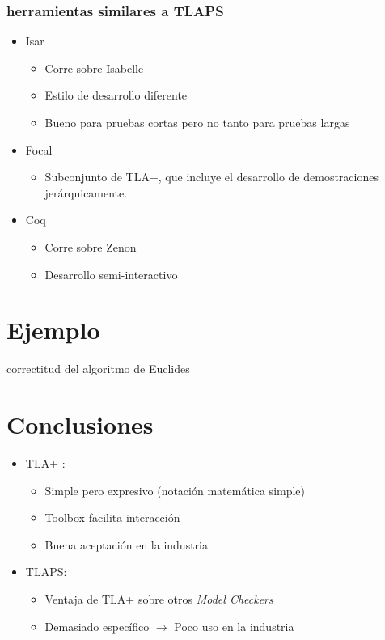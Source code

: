 \documentclass[12pt]{beamer}
\newenvironment{stepitemize}{\begin{itemize}[<+->]}{\end{itemize} }
\begin{document}
\begin{frame}

  \frametitle{herramientas similares a TLAPS}
  \begin{stepitemize}
	  \item Isar
	  \begin{itemize}
	    \item Corre sobre Isabelle
	    \item Estilo de desarrollo diferente
	    \item Bueno para pruebas cortas pero no tanto para pruebas largas
	   \end{itemize}
	   \item Focal
	    \begin{itemize}
	     \item Subconjunto de TLA+, que incluye el desarrollo de demostraciones jerárquicamente. 
	    \end{itemize}
	   \item Coq
	   \begin{itemize}
	    \item Corre sobre Zenon
	    \item Desarrollo semi-interactivo
	   \end{itemize}

	    

  \end{stepitemize}


\end{frame}

\section{Ejemplo}
\begin{frame}
correctitud del algoritmo de Euclides
\end{frame}

\section{Conclusiones}
\begin{frame}
  \begin{stepitemize}
  \item TLA+ : 
  	   \begin{itemize}
	    \item Simple pero expresivo (notación matemática simple)
	    \item Toolbox facilita interacción
	    \item Buena aceptación en la industria
	   \end{itemize}
  \item TLAPS: 
    	   \begin{itemize}
	    \item Ventaja de TLA+ sobre otros \textit{Model Checkers}
	    \item Demasiado específico $\rightarrow$ Poco uso en la industria
	   \end{itemize}
  \end{stepitemize}
\end{frame}
\end{document}
